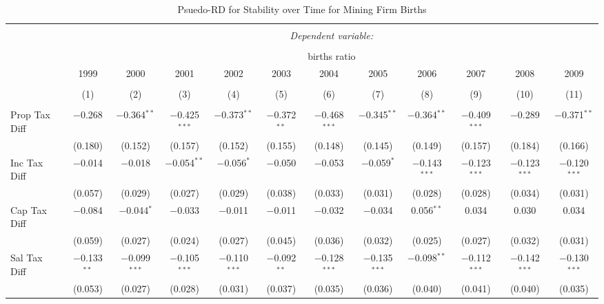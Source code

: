
\begin{table}[!htbp] \centering 
  \caption{Psuedo-RD for Stability over Time for  Mining Firm Births} 
  \label{21year} 
\small 
\begin{tabular}{@{\extracolsep{5pt}}lccccccccccc} 
\\[-1.8ex]\hline 
\hline \\[-1.8ex] 
 & \multicolumn{11}{c}{\textit{Dependent variable:}} \\ 
\cline{2-12} 
\\[-1.8ex] & \multicolumn{11}{c}{births ratio} \\ 
 & 1999 & 2000 & 2001 & 2002 & 2003 & 2004 & 2005 & 2006 & 2007 & 2008 & 2009 \\ 
\\[-1.8ex] & (1) & (2) & (3) & (4) & (5) & (6) & (7) & (8) & (9) & (10) & (11)\\ 
\hline \\[-1.8ex] 
 Prop Tax Diff & $-$0.268 & $-$0.364$^{**}$ & $-$0.425$^{***}$ & $-$0.373$^{**}$ & $-$0.372$^{**}$ & $-$0.468$^{***}$ & $-$0.345$^{**}$ & $-$0.364$^{**}$ & $-$0.409$^{***}$ & $-$0.289 & $-$0.371$^{**}$ \\ 
  & (0.180) & (0.152) & (0.157) & (0.152) & (0.155) & (0.148) & (0.145) & (0.149) & (0.157) & (0.184) & (0.166) \\ 
  Inc Tax Diff & $-$0.014 & $-$0.018 & $-$0.054$^{**}$ & $-$0.056$^{*}$ & $-$0.050 & $-$0.053 & $-$0.059$^{*}$ & $-$0.143$^{***}$ & $-$0.123$^{***}$ & $-$0.123$^{***}$ & $-$0.120$^{***}$ \\ 
  & (0.057) & (0.029) & (0.027) & (0.029) & (0.038) & (0.033) & (0.031) & (0.028) & (0.028) & (0.034) & (0.031) \\ 
  Cap Tax Diff & $-$0.084 & $-$0.044$^{*}$ & $-$0.033 & $-$0.011 & $-$0.011 & $-$0.032 & $-$0.034 & 0.056$^{**}$ & 0.034 & 0.030 & 0.034 \\ 
  & (0.059) & (0.027) & (0.024) & (0.027) & (0.045) & (0.036) & (0.032) & (0.025) & (0.027) & (0.032) & (0.031) \\ 
  Sal Tax Diff & $-$0.133$^{**}$ & $-$0.099$^{***}$ & $-$0.105$^{***}$ & $-$0.110$^{***}$ & $-$0.092$^{**}$ & $-$0.128$^{***}$ & $-$0.135$^{***}$ & $-$0.098$^{**}$ & $-$0.112$^{***}$ & $-$0.142$^{***}$ & $-$0.130$^{***}$ \\ 
  & (0.053) & (0.027) & (0.028) & (0.031) & (0.037) & (0.035) & (0.036) & (0.040) & (0.041) & (0.040) & (0.035) \\ 

\end{tabular}
\end{table}
